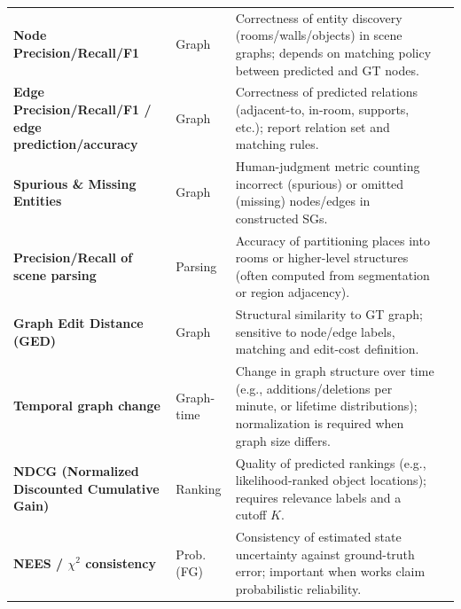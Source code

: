 \begin{table}[!htbp]
\begin{tabularx}{\textwidth}{@{}X l X@{} r}
\midrule

\textbf{Node Precision/Recall/F1} & Graph &
Correctness of entity discovery (rooms/walls/objects) in scene graphs; depends on matching policy between predicted and GT nodes. 
& \cite{zhang_open-vocabulary_2025} \cite{ferraina_lost-3dsg_2026}\\
\textbf{Edge Precision/Recall/F1 / edge prediction/accuracy} & Graph &
Correctness of predicted relations (adjacent-to, in-room, supports, etc.); report relation set and matching rules. 
& \cite{zhang_open-vocabulary_2025}\\
\textbf{Spurious \& Missing Entities} & Graph &
Human-judgment metric counting incorrect (spurious) or omitted (missing) nodes/edges in constructed SGs. 
& \cite{kim_3-d_2020}\\
\textbf{Precision/Recall of scene parsing} & Parsing &
Accuracy of partitioning places into rooms or higher-level structures (often computed from segmentation or region adjacency). 
& \cite{rosinol_3d_2020}\cite{rosinol_kimera_2020}\\
\textbf{Graph Edit Distance (GED)} & Graph &
Structural similarity to GT graph; sensitive to node/edge labels,  matching and edit-cost definition. 
& \textcolor{yellow}{\cite{milewski2026human}}\\
\textbf{Temporal  graph change} & Graph-time &
 Change in graph structure over time (e.g., additions/deletions per minute, or lifetime distributions); normalization is required when graph size differs. 
& \cite{guo2026ssprcd} \\

\midrule

\textbf{NDCG (Normalized Discounted Cumulative Gain)} & Ranking &
Quality of predicted rankings (e.g., likelihood-ranked object locations); requires relevance labels and a cutoff $K$. 
& \cite{kurenkov_modeling_2023}\\

\midrule

\textbf{NEES / $\chi^2$ consistency} & Prob. (FG) &
Consistency of estimated state uncertainty against ground-truth error; important when works claim probabilistic reliability.
&\cite{ila2009information}\\

\midrule
\midrule


\end{tabularx}
\end{table}
